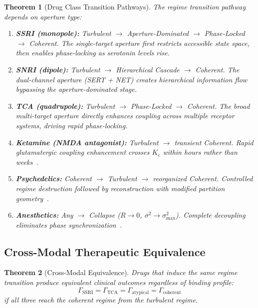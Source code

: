\documentclass[twocolumn,10pt]{article}
\newtheorem{theorem}{Theorem}[section]
\theoremstyle{remark}
\newcommand{\Rorder}{R}
\newcommand{\Gstate}{\Gamma}
\begin{document}
\begin{theorem}[Drug Class Transition Pathways]
\label{thm:pathways}
The regime transition pathway depends on aperture type:
\begin{enumerate}[nosep]
  \item \textbf{SSRI (monopole):} Turbulent $\to$ Aperture-Dominated $\to$ Phase-Locked $\to$ Coherent. The single-target aperture first restricts accessible state space, then enables phase-locking as serotonin levels rise.
  \item \textbf{SNRI (dipole):} Turbulent $\to$ Hierarchical Cascade $\to$ Coherent. The dual-channel aperture (SERT + NET) creates hierarchical information flow bypassing the aperture-dominated stage.
  \item \textbf{TCA (quadrupole):} Turbulent $\to$ Phase-Locked $\to$ Coherent. The broad multi-target aperture directly enhances coupling across multiple receptor systems, driving rapid phase-locking.
  \item \textbf{Ketamine (NMDA antagonist):} Turbulent $\to$ transient Coherent. Rapid glutamatergic coupling enhancement crosses $K_c$ within hours rather than weeks~\citep{berman2000antidepressant,zarate2006randomized}.
  \item \textbf{Psychedelics:} Coherent $\to$ Turbulent $\to$ reorganized Coherent. Controlled regime destruction followed by reconstruction with modified partition geometry~\citep{carhart2016neural,petri2014homological}.
  \item \textbf{Anesthetics:} Any $\to$ Collapse ($\Rorder \to 0$, $\sigma^2 \to \sigma^2_{\max}$). Complete decoupling eliminates phase synchronization~\citep{alkire2008consciousness,mashour2005cognitive}.
\end{enumerate}
\end{theorem}

\subsection{Cross-Modal Therapeutic Equivalence}

\begin{theorem}[Cross-Modal Equivalence]
\label{thm:crossmodal}
Drugs that induce the same regime transition produce equivalent clinical outcomes regardless of binding profile:
\begin{equation}
  \Gstate_{\mathrm{SSRI}} = \Gstate_{\mathrm{TCA}} = \Gstate_{\mathrm{atypical}} = \Gstate_{\mathrm{coherent}}
\end{equation}
if all three reach the coherent regime from the turbulent regime.
\end{theorem}
\end{document}
